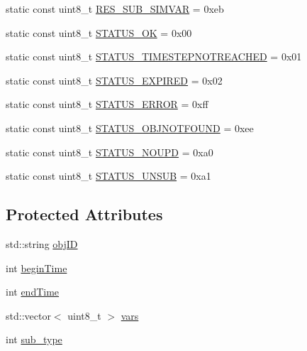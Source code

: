 \begin{DoxyCompactItemize}
\item 
static const uint8\+\_\+t \hyperlink{classtraci__api_1_1_variable_subscription_aa92eced34d95ef3c695d64600e4dbf80}{R\+E\+S\+\_\+\+S\+U\+B\+\_\+\+S\+I\+M\+V\+AR} = 0xeb
\item 
static const uint8\+\_\+t \hyperlink{classtraci__api_1_1_variable_subscription_ad14b04a2a4f37e74e0e19c59a0f3fae7}{S\+T\+A\+T\+U\+S\+\_\+\+OK} = 0x00
\item 
static const uint8\+\_\+t \hyperlink{classtraci__api_1_1_variable_subscription_afa345f07263b38b4a6d61722ad22309f}{S\+T\+A\+T\+U\+S\+\_\+\+T\+I\+M\+E\+S\+T\+E\+P\+N\+O\+T\+R\+E\+A\+C\+H\+ED} = 0x01
\item 
static const uint8\+\_\+t \hyperlink{classtraci__api_1_1_variable_subscription_ae91ce93cc39a680b5088c1b28834c246}{S\+T\+A\+T\+U\+S\+\_\+\+E\+X\+P\+I\+R\+ED} = 0x02
\item 
static const uint8\+\_\+t \hyperlink{classtraci__api_1_1_variable_subscription_add55a331f858d6cfa1a3d5609d4c1a7a}{S\+T\+A\+T\+U\+S\+\_\+\+E\+R\+R\+OR} = 0xff
\item 
static const uint8\+\_\+t \hyperlink{classtraci__api_1_1_variable_subscription_a10eb7cead6a6689d713e65ddb068b4ab}{S\+T\+A\+T\+U\+S\+\_\+\+O\+B\+J\+N\+O\+T\+F\+O\+U\+ND} = 0xee
\item 
static const uint8\+\_\+t \hyperlink{classtraci__api_1_1_variable_subscription_a3a7fe58d3e83a4bf6659aea09dc69634}{S\+T\+A\+T\+U\+S\+\_\+\+N\+O\+U\+PD} = 0xa0
\item 
static const uint8\+\_\+t \hyperlink{classtraci__api_1_1_variable_subscription_a87512a19d6d41a2ffa432fc08b5773ab}{S\+T\+A\+T\+U\+S\+\_\+\+U\+N\+S\+UB} = 0xa1
\end{DoxyCompactItemize}
\subsection*{Protected Attributes}
\begin{DoxyCompactItemize}
\item 
std\+::string \hyperlink{classtraci__api_1_1_variable_subscription_a4a668b1a6bbb132afeb8800979808042}{obj\+ID}
\item 
int \hyperlink{classtraci__api_1_1_variable_subscription_a65f7046b1e5ab13b5f742b0db3b5c03e}{begin\+Time}
\item 
int \hyperlink{classtraci__api_1_1_variable_subscription_a7149b62cac3a1c0285de28167c5c4abc}{end\+Time}
\item 
std\+::vector$<$ uint8\+\_\+t $>$ \hyperlink{classtraci__api_1_1_variable_subscription_a59bec6554debe2d14d75c29017561959}{vars}
\item 
int \hyperlink{classtraci__api_1_1_variable_subscription_a93110dcf3a32ff7a6a73ad3f8ff371d6}{sub\+\_\+type}
\end{DoxyCompactItemize}


